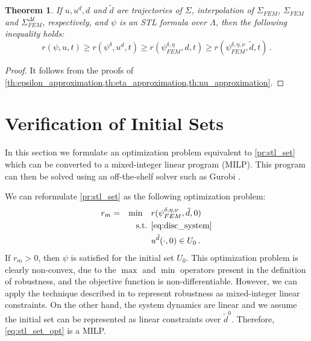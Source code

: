 \documentclass[letterpaper, 10 pt, conference]{ieeeconf/ieeeconf}
\newtheorem{theorem}{Theorem}
\begin{document}
\begin{theorem}
    \label{th:robustness}
    If $u, u^d, d$ and $\tilde{d}$ are trajectories of $\Sigma$, interpolation
    of $\Sigma_{FEM}$, $\Sigma_{FEM}$ and $\Sigma_{FEM}^{\Delta t}$,
    respectively, and $\psi$ is an STL formula over $\Lambda$, then the 
    following inequality holds:
    \begin{equation}
        r(\psi, u, t) \geq r(\psi^{\delta}, u^d, t) \geq r(\psi^{\delta,
        \eta}_{FEM}, d, t) \geq r(\psi^{\delta, \eta, \nu}_{FEM}, \tilde{d}, t)
        \,.
    \end{equation}
\end{theorem}
\begin{proof}
    It follows from the proofs of
    \cref{th:epsilon_approximation,th:eta_approximation,th:nu_approximation}.
\end{proof}

\section{Verification of Initial Sets}
\label{sec:verification_of_initial_sets}

In this section we formulate an optimization problem equivalent to
\cref{pr:stl_set} which can be converted to a mixed-integer linear program
(MILP). This program can then be solved using an off-the-shelf solver such 
as Gurobi \cite{gurobi}.

We can reformulate \cref{pr:stl_set} as the following optimization problem:
%
\begin{equation}
    \label{eq:stl_set_opt}
    \begin{aligned}
        &r_m = &\min \quad &r(\psi^{\delta, \eta, \nu}_{FEM}, \tilde{d}, 0) \\
        &  &\text{s.t. } &\cref{eq:disc_system} \\
        &  & &u^{\tilde{d}}(\cdot, 0) \in U_0 \,.
    \end{aligned}
\end{equation}
%
If $r_m > 0$, then $\psi$ is satisfied for the initial set $U_0$. This
optimization problem is clearly non-convex, due to the $\max$ and $\min$
operators present in the definition of robustness, and the objective function is
non-differentiable. However, we can apply the technique described in
\cite{sadraddini_robust_2015} to
represent robustness as mixed-integer linear constraints. On the other hand, the
system dynamics are linear and we assume the initial set can be represented as
linear constraints over $\tilde{d}^0$. Therefore, \cref{eq:stl_set_opt} is a
MILP.
\end{document}

